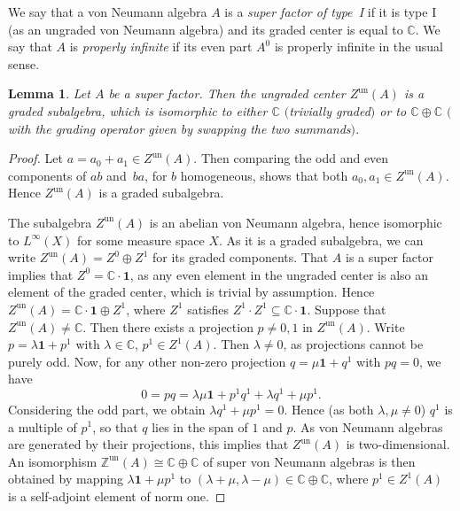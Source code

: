 \documentclass[10pt,a4paper]{amsart}
\numberwithin{equation}{section}
\newtheorem{Lemma}[Theorem]{Lemma}
\newcommand{\Z}{\mathbb{Z}}
\newcommand{\C}{\mathbb{C}}
\begin{document}
\begin{Definition}
We say that a von Neumann algebra $A$ is a \emph{super factor of type~I} if it is type I (as an ungraded von Neumann algebra) and its graded center is equal to $\C$.
We say that $A$ is \emph{properly infinite} if its even part $A^0$ is properly infinite in the usual sense.
\end{Definition}


\begin{Lemma}
\label{LemmaCenterOfSuperFactor}
 Let $A$ be a super factor.
 Then the ungraded center $Z^{\mathrm{un}}(A)$ is a graded subalgebra, which is isomorphic to either $\C$ $($trivially graded$)$ or to $\C \oplus \C$ $($with the grading operator given by swapping the two summands$)$.
\end{Lemma}

\begin{proof}
Let $a = a_0 + a_1 \in Z^{\mathrm{un}}(A)$.
Then comparing the odd and even components of $ab$ and~$ba$, for $b$ homogeneous, shows that both $a_0, a_1 \in Z^{\mathrm{un}}(A)$.
Hence $Z^{\mathrm{un}}(A)$ is a graded subalgebra.

The subalgebra $Z^{\mathrm{un}}(A)$ is an abelian von Neumann algebra, hence isomorphic to $L^\infty(X)$ for some measure space $X$.
As it is a graded subalgebra, we can write $Z^{\mathrm{un}}(A) = Z^0 \oplus Z^1$ for its graded components.
That $A$ is a super factor implies that $Z^0 = \C \cdot \mathbf{1}$, as any even element in the ungraded center is also an element of the graded center, which is trivial by assumption.
Hence $Z^{\mathrm{un}}(A) = \C\cdot \mathbf{1} \oplus Z^1$, where $Z^1$ satisfies $Z^1 \cdot Z^1 \subseteq \C\cdot \mathbf{1}$.
Suppose that $Z^{\mathrm{un}}(A) \neq \C$.
Then there exists a projection $p \neq 0, 1$ in $Z^{\mathrm{un}}(A)$.
Write $p = \lambda \mathbf{1} + p^1$ with $\lambda \in \C$, $p^1 \in Z^1(A)$.
Then $\lambda \neq 0$, as projections cannot be purely odd.
Now, for any other non-zero projection $q = \mu \mathbf{1} + q^1$ with $pq = 0$, we have
\begin{equation*}
 0 = pq = \lambda \mu \mathbf{1} + p^1q^1 + \lambda q^1 + \mu p^1.
\end{equation*}
Considering the odd part, we obtain $\lambda q^1 + \mu p^1 = 0$.
Hence (as both $\lambda, \mu \neq 0$) $q^1$ is a multiple of $p^1$, so that $q$ lies in the span of $1$ and $p$.
As von Neumann algebras are generated by their projections, this implies that $Z^{\mathrm{un}}(A)$ is two-dimensional.
An isomorphism $\Z^{\mathrm{un}}(A) \cong \C \oplus \C$ of super von Neumann algebras is then obtained by mapping $\lambda \mathbf{1} + \mu p^1$ to $(\lambda + \mu, \lambda - \mu) \in \C \oplus\C$, where $p^1 \in Z^1(A)$ is a self-adjoint element of norm one.
\end{proof}
\end{document}
